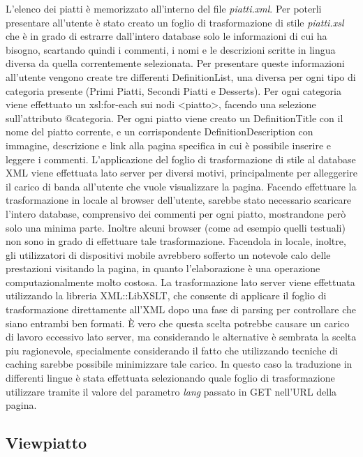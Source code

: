 \documentclass[10pt,a4paper,onecolumn]{article}
\begin{document}
L’elenco dei piatti è memorizzato all’interno del file \textit{piatti.xml}. Per poterli presentare all’utente è stato creato un foglio di trasformazione di stile \textit{piatti.xsl} che è in grado di estrarre dall’intero database solo le informazioni di cui ha bisogno, scartando quindi i commenti, i nomi e le descrizioni scritte in lingua diversa da quella correntemente selezionata.
Per presentare queste informazioni all’utente vengono create tre differenti DefinitionList, una diversa per ogni tipo di categoria presente (Primi Piatti, Secondi Piatti e Desserts).
Per ogni categoria viene effettuato un xsl:for-each sui nodi <piatto>, facendo una selezione sull’attributo @categoria. Per ogni piatto viene creato un DefinitionTitle con il nome del piatto corrente, e un corrispondente DefinitionDescription con immagine, descrizione e link alla pagina specifica in cui è possibile inserire e leggere i commenti.
L’applicazione del foglio di trasformazione di stile al database XML viene effettuata lato server per diversi motivi, principalmente per alleggerire il carico di banda all’utente che vuole visualizzare la pagina. Facendo effettuare la trasformazione in locale al browser dell’utente, sarebbe stato necessario scaricare l’intero database, comprensivo dei commenti per ogni piatto, mostrandone però solo una minima parte. Inoltre alcuni browser (come ad esempio quelli testuali) non sono in grado di effettuare tale trasformazione. Facendola in locale, inoltre, gli utilizzatori di dispositivi mobile avrebbero sofferto un notevole calo delle prestazioni visitando la pagina, in quanto l’elaborazione è una operazione computazionalmente molto costosa.
La trasformazione lato server viene effettuata utilizzando la libreria XML::LibXSLT, che consente di applicare il foglio di trasformazione direttamente all’XML dopo una fase di parsing per controllare che siano entrambi ben formati.
\`E vero che questa scelta potrebbe causare un carico di lavoro eccessivo lato server, ma considerando le alternative è sembrata la scelta piu ragionevole, specialmente considerando il fatto che utilizzando tecniche di caching sarebbe possibile minimizzare tale carico.
In questo caso la traduzione in differenti lingue è stata effettuata selezionando quale foglio di trasformazione utilizzare tramite il valore del parametro \textit{lang} passato in GET nell’URL della pagina.

\subsection{Viewpiatto}
\end{document}
